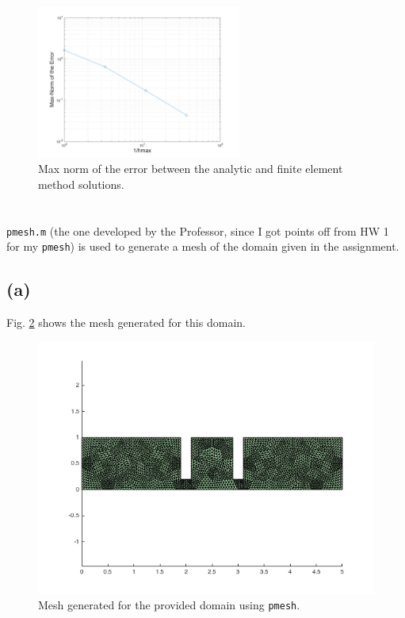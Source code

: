 \documentclass[10pt]{article}
\begin{document}
\begin{figure}[H]
\centering
\includegraphics[width=0.6\textwidth]{error.png}
\caption{Max norm of the error between the analytic and finite element method solutions.}
\label{fig:1}
\end{figure}





\section{} %

{\tt pmesh.m} (the one developed by the Professor, since I got points off from HW 1 for my {\tt pmesh}) is used to generate a mesh of the domain given in the assignment. 

\subsection{(a)}

Fig. \ref{fig:q3mesh} shows the mesh generated for this domain.

\begin{figure}[H]
\centering
\includegraphics[width=1.0\textwidth]{mesh_q3.png}
\caption{Mesh generated for the provided domain using {\tt pmesh}.}
\label{fig:q3mesh}
\end{figure}
\end{document}
